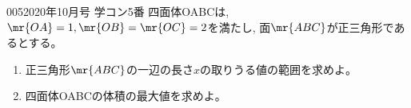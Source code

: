 \begin{prob}{005}{}{2020年10月号 学コン5番}
 四面体OABCは, $\mr{OA}=1, \mr{OB}=\mr{OC}=2$を満たし, 面$\mr{ABC}$が正三角形であるとする。
 \begin{enumerate}
  \item 正三角形$\mr{ABC}$の一辺の長さ$x$の取りうる値の範囲を求めよ。
  \item 四面体OABCの体積の最大値を求めよ。
 \end{enumerate}
\end{prob}

